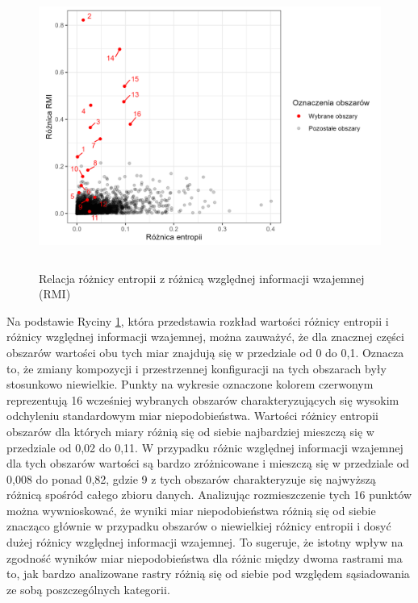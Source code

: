 \documentclass{amuthesis}
\begin{document}
\begin{figure}[t]

{\centering \includegraphics[width=5.20833in,height=3.64583in]{figures/clc_ent_vs_relmutinf.png}

}

\caption{\label{fig-clc_ent_vs_relmutinf}Relacja różnicy entropii z
różnicą względnej informacji wzajemnej (RMI)}

\end{figure}

Na podstawie Ryciny \ref{fig-clc_ent_vs_relmutinf}, która przedstawia
rozkład wartości różnicy entropii i różnicy względnej informacji
wzajemnej, można zauważyć, że dla znacznej części obszarów wartości obu
tych miar znajdują się w przedziale od 0 do 0,1. Oznacza to, że zmiany
kompozycji i przestrzennej konfiguracji na tych obszarach były
stosunkowo niewielkie. Punkty na wykresie oznaczone kolorem czerwonym
reprezentują 16 wcześniej wybranych obszarów charakteryzujących się
wysokim odchyleniu standardowym miar niepodobieństwa. Wartości różnicy
entropii obszarów dla których miary różnią się od siebie najbardziej
mieszczą się w przedziale od 0,02 do 0,11. W przypadku różnic względnej
informacji wzajemnej dla tych obszarów wartości są bardzo zróżnicowane i
mieszczą się w przedziale od 0,008 do ponad 0,82, gdzie 9 z tych
obszarów charakteryzuje się najwyższą różnicą spośród całego zbioru
danych. Analizując rozmieszczenie tych 16 punktów można wywnioskować, że
wyniki miar niepodobieństwa różnią się od siebie znacząco głównie w
przypadku obszarów o niewielkiej różnicy entropii i dosyć dużej różnicy
względnej informacji wzajemnej. To sugeruje, że istotny wpływ na
zgodność wyników miar niepodobieństwa dla różnic między dwoma rastrami
ma to, jak bardzo analizowane rastry różnią się od siebie pod względem
sąsiadowania ze sobą poszczególnych kategorii.
\end{document}
